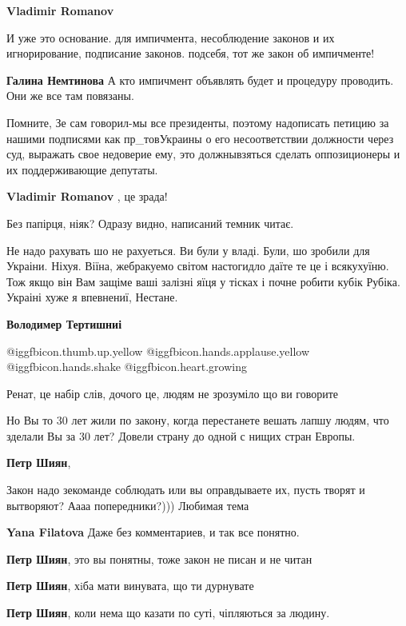 \begin{itemize}
\begin{itemize} %
\textbf{Vladimir Romanov} 

И уже это основание. для импичмента, несоблюдение законов и их
игнорирование, подписание законов. подсебя, тот же закон об импичменте!

\textbf{Галина Немтинова} А кто импичмент объявлять будет и процедуру проводить. Они же все там повязаны.


Помните, Зе сам говорил-мы все президенты, поэтому надописать петицию за нашими
подписями как пр\_товУкраины о его несоответствии должности через суд, выражать
свое недоверие ему, это должнывзяться сделать оппозиционеры и их поддерживающие
депутаты.


\textbf{Vladimir Romanov} , це зрада!
\end{itemize} %

Без папірця, ніяк? Одразу видно, написаний темник читає.


Не надо рахувать шо не рахуеться. Ви були у владі. Були, шо зробили для
Украіни. Ніхуя. Віїна, жебракуемо світом настогидло даїте те це і всякухуїню.
Тож якщо він Вам защіме ваші залізні яїця у тісках і почне робити кубік Рубіка.
Украіні хуже я впевнениї, Нестане.

\textbf{Володимер Тертишниі}

 @igg{fbicon.thumb.up.yellow}  @igg{fbicon.hands.applause.yellow}
 @igg{fbicon.hands.shake}  @igg{fbicon.heart.growing} 


Ренат, це набір слів, дочого це, людям не зрозуміло що ви говорите


Но Вы то 30 лет жили по закону, когда перестанете вешать лапшу людям, что зделали
Вы за 30 лет? Довели страну до одной с нищих стран Европы.

\begin{itemize} %
\textbf{Петр Шиян}, 

Закон надо зекоманде соблюдать или вы оправдываете их, пусть творят и
вытворяют? Аааа попередники?))) Любимая тема

\textbf{Yana Filatova} Даже без комментариев, и так все понятно.

\textbf{Петр Шиян}, это вы понятны, тоже закон не писан и не читан

\textbf{Петр Шиян}, хiба мати винувата, що ти дурнувате

\textbf{Петр Шиян}, коли нема що казати по суті, чіпляються за людину.

\end{itemize} %

\end{itemize} %
